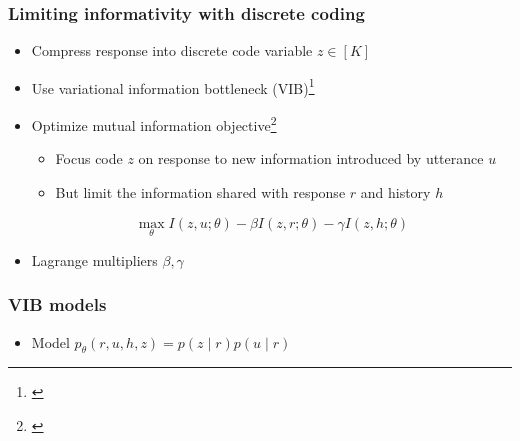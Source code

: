 \documentclass{beamer}
\begin{document}
\begin{frame}
\frametitle{Limiting informativity with discrete coding}
\begin{itemize}
\item Compress response into discrete code variable $z \in [K]$
\item Use variational information bottleneck (VIB)\footnote{\citet{vib}}
\item Optimize mutual information objective\footnote{\citet{li}}
    \begin{itemize}
    \item Focus code $z$ on response to new information introduced by utterance $u$
    \item But limit the information shared with response $r$ and history $h$
    \end{itemize}
$$\max_\theta I(z, u; \theta) - \beta I(z, r; \theta) - \gamma I(z, h; \theta)$$
\item Lagrange multipliers $\beta,\gamma$
\end{itemize}
\end{frame}

\begin{frame}
\frametitle{VIB models}
\begin{itemize}
\item Model $p_\theta(r, u, h, z) = p(z \mid r)p(u \mid r)$
\end{itemize}
\begin{center}
\end{center}
\end{frame}
\end{document}
